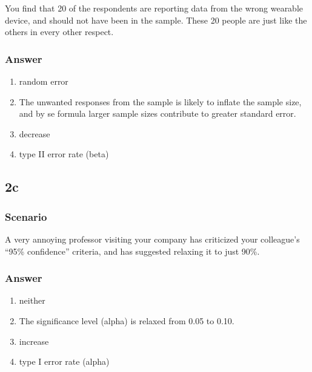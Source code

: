 \documentclass[
]{article}
\providecommand{\tightlist}{%
  \setlength{\itemsep}{0pt}\setlength{\parskip}{0pt}}
\begin{document}
You find that 20 of the respondents are reporting data from the wrong
wearable device, and should not have been in the sample. These 20 people
are just like the others in every other respect.

\hypertarget{answer-1}{%
\subsubsection{\texorpdfstring{\textbf{Answer}}{Answer}}\label{answer-1}}

\begin{enumerate}
\def\labelenumi{\arabic{enumi}.}
\tightlist
\item
  random error
\item
  The unwanted responses from the sample is likely to inflate the sample
  size, and by se formula larger sample sizes contribute to greater
  standard error.
\item
  decrease
\item
  type II error rate (beta)
\end{enumerate}

\hypertarget{c-1}{%
\subsection{2c}\label{c-1}}

\hypertarget{scenario-2}{%
\subsubsection{\texorpdfstring{\textbf{Scenario}}{Scenario}}\label{scenario-2}}

A very annoying professor visiting your company has criticized your
colleague's ``95\% confidence'' criteria, and has suggested relaxing it
to just 90\%.

\hypertarget{answer-2}{%
\subsubsection{\texorpdfstring{\textbf{Answer}}{Answer}}\label{answer-2}}

\begin{enumerate}
\def\labelenumi{\arabic{enumi}.}
\tightlist
\item
  neither
\item
  The significance level (alpha) is relaxed from 0.05 to 0.10.
\item
  increase
\item
  type I error rate (alpha)
\end{enumerate}
\end{document}
